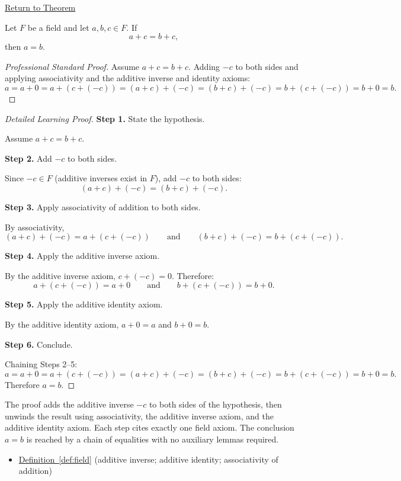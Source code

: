 \newpage
{}
\label{prf:additive-cancellation}

\begin{remark*}[Return]
\hyperref[thm:additive-cancellation]{Return to Theorem}
\end{remark*}

\begin{theorem*}
Let $F$ be a field and let $a,b,c\in F$.  If
\[
a + c = b + c,
\]
then $a = b$.
\end{theorem*}

\begin{proof}[Professional Standard Proof]
\LRAProofBodyStart
Assume $a + c = b + c$.  Adding $-c$ to both sides and applying
associativity and the additive inverse and identity axioms:
\[
a = a + 0 = a + (c + (-c)) = (a + c) + (-c) = (b + c) + (-c) = b + (c + (-c)) = b + 0 = b.
\]
\end{proof}

\begin{proof}[Detailed Learning Proof]
\LRAProofBodyStart

\textbf{Step 1.} State the hypothesis.

Assume $a + c = b + c$.

\textbf{Step 2.} Add $-c$ to both sides.

Since $-c\in F$ (additive inverses exist in $F$), add $-c$ to both sides:
\[
(a + c) + (-c) = (b + c) + (-c).
\]

\textbf{Step 3.} Apply associativity of addition to both sides.

By associativity,
\[
(a + c) + (-c) = a + (c + (-c))
\qquad\text{and}\qquad
(b + c) + (-c) = b + (c + (-c)).
\]

\textbf{Step 4.} Apply the additive inverse axiom.

By the additive inverse axiom, $c + (-c) = 0$.  Therefore:
\[
a + (c + (-c)) = a + 0
\qquad\text{and}\qquad
b + (c + (-c)) = b + 0.
\]

\textbf{Step 5.} Apply the additive identity axiom.

By the additive identity axiom, $a + 0 = a$ and $b + 0 = b$.

\textbf{Step 6.} Conclude.

Chaining Steps 2--5:
\[
a = a + 0 = a + (c + (-c)) = (a+c) + (-c) = (b+c) + (-c) = b + (c+(-c)) = b + 0 = b.
\]
Therefore $a = b$.
\end{proof}

\begin{remark*}
The proof adds the additive inverse $-c$ to both sides of the hypothesis,
then unwinds the result using associativity, the additive inverse axiom, and
the additive identity axiom.  Each step cites exactly one field axiom.  The
conclusion $a = b$ is reached by a chain of equalities with no auxiliary
lemmas required.
\end{remark*}

\begin{dependencies}
\begin{itemize}
  \item \hyperref[def:field]{Definition~\ref*{def:field}}
        \textnormal{(additive inverse; additive identity; associativity of addition)}
\end{itemize}
\end{dependencies}

\clearpage
